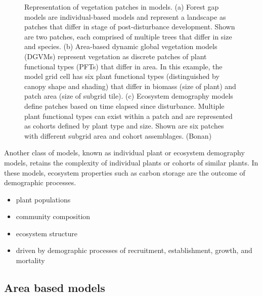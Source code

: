 \documentclass[
  12pt,
  oneside]{book}
\providecommand{\tightlist}{%
  \setlength{\itemsep}{0pt}\setlength{\parskip}{0pt}}
\begin{document}
\begin{figure}
{}

\caption{Representation of vegetation patches in models. (a) Forest gap models are individual-based models and represent a landscape as patches that differ in stage of post-disturbance development. Shown are two patches, each comprised of multiple trees that differ in size and species. (b) Area-based dynamic global vegetation models (DGVMs) represent vegetation as discrete patches of plant functional types (PFTs) that differ in area. In this example, the model grid cell has six plant functional types (distinguished by canopy shape and shading) that differ in biomass (size of plant) and patch area (size of subgrid tile). (c) Ecosystem demography models define patches based on time elapsed since disturbance. Multiple plant functional types can exist within a patch and are represented as cohorts defined by plant type and size. Shown are six patches with different subgrid area and cohort assemblages. (Bonan)}\label{fig:f63}
\end{figure}

Another class of models, known as individual plant or ecosystem demography models, retains the complexity of individual plants or cohorts of similar plants. In these models, ecosystem properties such as carbon storage are the outcome of demographic processes.

\begin{itemize}
\tightlist
\item
  plant populations
\item
  community composition
\item
  ecosystem structure
\item
  driven by demographic processes of recruitment, establishment, growth, and mortality
\end{itemize}

\hypertarget{area-based-models}{%
\subsection{Area based models}\label{area-based-models}}
\end{document}
